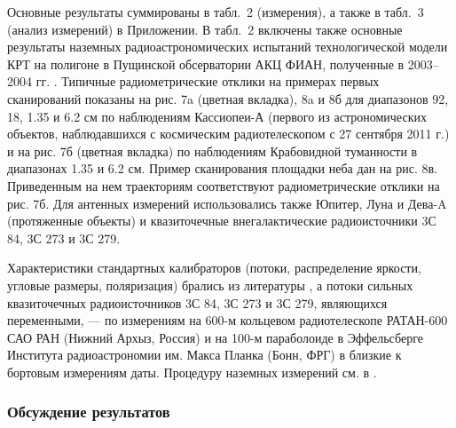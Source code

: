 Основные результаты суммированы в табл.~2 (измерения), а также в табл.~3 (анализ измерений) в
Приложении. В табл.~2
включены также основные результаты
наземных радиоастрономических испытаний технологической модели
КРТ на полигоне в Пущинской обсерватории АКЦ ФИАН,
полученные в 2003--2004 гг. \cite{}.
Типичные радиометрические отклики на примерах первых сканирований
показаны на рис. 7a (цветная вкладка), 8a и 8б
для диапазонов 92, 18, 1.35 и
6.2 см по наблюдениям Кассиопеи-А (первого из астрономических объектов,
наблюдавшихся с космическим радиотелескопом с 27 сентября 2011 г.) и
на рис. 7б (цветная вкладка) по наблюдениям Крабовидной туманности в диапазонах 1.35
и 6.2 см. Пример сканирования площадки неба дан на рис. 8в.
Приведенным на нем траекториям соответствуют радиометрические отклики
на рис. 7б. Для антенных измерений использовались также Юпитер, Луна и
Дева-A (протяженные объекты) и квазиточечные внегалактические
радиоисточники 3С 84, 3С 273 и 3С 279.


Характеристики  стандартных калибраторов (потоки, распределение яркости,
угловые размеры, поляризация) брались из литературы  \cite{},
а потоки сильных квазиточечных радиоисточников 3С 84, 3С 273 и 3С 279,
являющихся переменными, --- по измерениям на 600-м кольцевом
радиотелескопе РАТАН-600 САО РАН (Нижний Архыз, Россия) и на
100-м параболоиде в Эффельсберге Института радиоастрономии
им. Макса Планка (Бонн, ФРГ) \cite{} в близкие к бортовым измерениям
даты. Процедуру наземных измерений см. в \cite{}.


\subsubsection{Обсуждение результатов}


